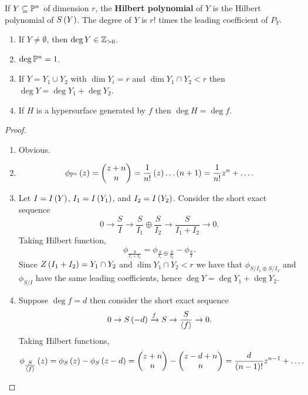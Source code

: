 \pagebreak

\begin{definition}
If $ Y \subseteq \mathbb{P}^n $ of dimension $ r $, the \textbf{Hilbert polynomial} of $ Y $ is the Hilbert polynomial of $ S\br{Y} $. The degree of $ Y $ is $ r! $ times the leading coefficient of $ P_Y $.
\end{definition}

\begin{theorem}
\hfill
\begin{enumerate}
\item If $ Y \ne \emptyset $, then $ \deg Y \in \mathbb{Z}_{> 0} $.
\item $ \deg \mathbb{P}^n = 1 $.
\item If $ Y = Y_1 \cup Y_2 $ with $ \dim Y_i = r $ and $ \dim Y_1 \cap Y_2 < r $ then $ \deg Y = \deg Y_1 + \deg Y_2 $.
\item If $ H $ is a hypersurface generated by $ f $ then $ \deg H = \deg f $.
\end{enumerate}
\end{theorem}

\begin{proof}
\hfill
\begin{enumerate}
\item Obvious.
\item
$$ \phi_{\PP^n}\br{z} = \twobyone{z + n}{n} = \dfrac{1}{n!}\br{z} \dots \br{n + 1} = \dfrac{1}{n!}z^n + \dots. $$
\item Let $ I = I\br{Y} $, $ I_1 = I\br{Y_1} $, and $ I_2 = I\br{Y_2} $. Consider the short exact sequence
$$ 0 \to \dfrac{S}{I} \to \dfrac{S}{I_1} \oplus \dfrac{S}{I_2} \to \dfrac{S}{I_1 + I_2} \to 0. $$
Taking Hilbert function,
$$ \phi_{\tfrac{S}{I_1 + I_2}} = \phi_{\tfrac{S}{I_1} \oplus \tfrac{S}{I_2}} - \phi_{\tfrac{S}{I}}. $$
Since $ Z\br{I_1 + I_2} = Y_1 \cap Y_2 $ and $ \dim Y_1 \cap Y_2 < r $ we have that $ \phi_{S / I_1 \oplus S / I_2} $ and $ \phi_{S / I} $ have the same leading coefficients, hence $ \deg Y = \deg Y_1 + \deg Y_2 $.
\item Suppose $ \deg f = d $ then consider the short exact sequence
$$ 0 \to S\br{-d} \xrightarrow{f}{S} \to \dfrac{S}{\abr{f}} \to 0. $$
Taking Hilbert functions,
$$ \phi_{\tfrac{S}{\abr{f}}}\br{z} = \phi_S\br{z} - \phi_S\br{z - d} = \twobyone{z + n}{n} - \twobyone{z - d + n}{n} = \dfrac{d}{\br{n - 1}!}z^{n - 1} + \dots. $$
\end{enumerate}
\end{proof}

\pagebreak

